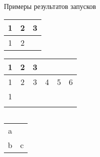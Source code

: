 \documentclass{article}
\begin{document}
Примеры результатов запусков

\begin{tabular}{|c|c|c|}
\hline
1 & 2 & 3 \\
\hline
1 & 2 &  \\
\hline
\end{tabular}

\begin{tabular}{|c|c|c|c|c|c|}
\hline
1 & 2 & 3 &  &  &  \\
\hline
1 & 2 & 3 & 4 & 5 & 6 \\
\hline
1 &  &  &  &  &  \\
\hline
 &  &  &  &  &  \\
\hline
\end{tabular}

\begin{tabular}{|c|}
\hline
 \\
\hline
\end{tabular}

\begin{tabular}{|c|c|}
\hline
 &  \\
\hline
a &  \\
\hline
b & c \\
\hline
\end{tabular}
\end{document}
